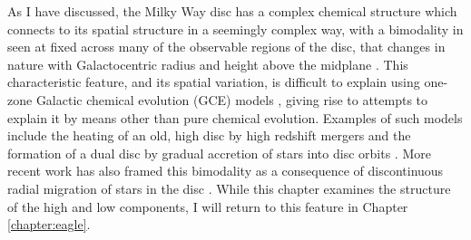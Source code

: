 
As I have discussed, the Milky Way disc has a complex chemical structure which connects to its spatial structure in a seemingly complex way, with a bimodality in \afe{} seen at fixed \feh{} across many of the observable regions of the disc, that changes in nature with Galactocentric radius and height above the midplane \citep{2003A&A...410..527B,2005A&A...433..185B,2014ApJ...796...38N,2015ApJ...808..132H}. This characteristic feature, and its spatial variation, is difficult to explain using one-zone Galactic chemical evolution (GCE) models \citep[most recently shown by][]{2016arXiv160408613A}, giving rise to attempts to explain it by means other than pure chemical evolution. Examples of such models include the heating of an old, high \afe{} disc by high redshift mergers \citep[e.g.][]{2004ApJ...612..894B,2008MNRAS.391.1806V,2009ApJ...700.1896K,2013A&A...558A...9M} and the formation of a dual disc by gradual accretion of stars into disc orbits \citep[e.g.][]{2003ApJ...597...21A}. More recent work has also framed this bimodality as a consequence of discontinuous radial migration of stars in the disc \citep{2016arXiv161009869T}. While this chapter examines the structure of the high and low \afe{} components, I will return to this feature in Chapter \ref{chapter:eagle}.

